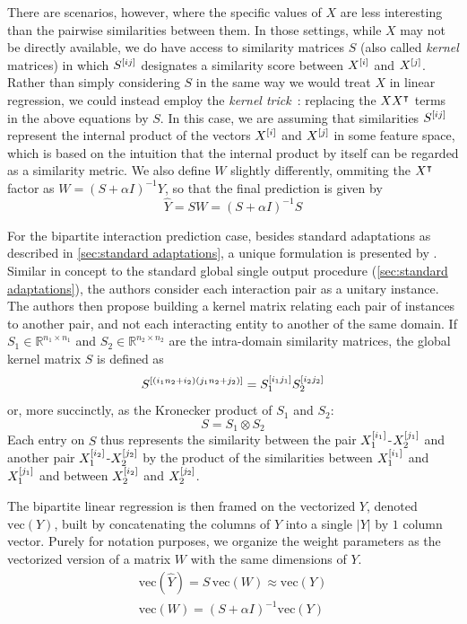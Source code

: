 There are scenarios, however, where the specific values of $X$ are less interesting than the pairwise similarities between them. In those settings, while $X$ may not be directly available, we do have access to similarity matrices $S$ (also called \emph{kernel} matrices) in which $S^{[ij]}$ designates a similarity score between $X^{[i]}$ and $X^{[j]}$. Rather than simply considering $S$ in the same way we would treat $X$ in linear regression, we could instead employ the \emph{kernel trick}~\cite{murphy2012machine}: replacing the $XX^\intercal$ terms in the above equations by $S$. In this case, we are assuming that similarities $S^{[ij]}$ represent the internal product of the vectors $X^{[i]}$ and $X^{[j]}$ in some feature space, which is based on the intuition that the internal product by itself can be regarded as a similarity metric.
%
We also define $W$ slightly differently, ommiting the $X^\intercal$ factor as $W = (S + \alpha I)^{-1} Y$, so that the final prediction is given by
%
\begin{equation}
    \hat Y = S W = (S + \alpha I)^{-1} S
\end{equation}

For the bipartite interaction prediction case, besides standard adaptations as described in \autoref{sec:standard adaptations}, a unique formulation is presented by \textcite{vanlaarhoven2011gaussian}. Similar in concept to the standard global single output procedure (\autoref{sec:standard adaptations}), the authors consider each interaction pair as a unitary instance. The authors then propose building a kernel matrix relating each pair of instances to another pair, and not each interacting entity to another of the same domain. If $S_1 \in \mathbb{R}^{n_1 \times n_1}$ and $S_2 \in \mathbb{R}^{n_2 \times n_2}$ are the intra-domain similarity matrices, the global kernel matrix $S$ is defined as
%
\begin{equation}
    S^{[(i_1n_2 + i_2)(j_1 n_2 + j_2)]} = S_1^{[i_1j_1]} S_2^{[i_2j_2]}
\end{equation}
%
or, more succinctly, as the Kronecker product of $S_1$ and $S_2$:
%
\begin{equation}
    S = S_1 \otimes S_2
\end{equation}
%
Each entry on $S$ thus represents the similarity between the pair $X_1^{[i_1]}$-$X_2^{[j_1]}$ and another pair $X_1^{[i_2]}$-$X_2^{[j_2]}$ by the product of the similarities between $X_1^{[i_1]}$ and $X_1^{[j_1]}$ and between $X_2^{[i_2]}$ and $X_2^{[j_2]}$.

The bipartite linear regression is then framed on the vectorized $Y$, denoted $\text{vec}(Y)$, built by concatenating the columns of $Y$ into a single $|Y|$ by $1$ column vector.
Purely for notation purposes, we organize the weight parameters as the vectorized version of a matrix $W$ with the same dimensions of $Y$.
%
\begin{gather}
    \text{vec}(\hat Y) = S\,\text{vec}(W) \approx \text{vec}(Y)
    \\
    \text{vec}(W) = (S + \alpha I)^{-1} \text{vec}(Y)
\end{gather}

